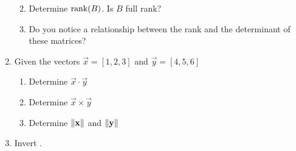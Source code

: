 \documentclass{16384_doc}
\begin{document}
\begin{questions}
\begin{parts}
\begin{enumerate}
\begin{enumerate}
\begin{tcolorbox}[height=3cm]
                        \end{tcolorbox}
						\item Determine $\operatorname{rank}(B)$. Is $B$ full rank?
						\begin{tcolorbox}[height=3cm]
					
                        \end{tcolorbox}
						\item Do you notice a relationship between the rank and the 
						determinant of these matrices?    
						\begin{tcolorbox}[height=5cm]
					
                        \end{tcolorbox}
					\end{enumerate}
					\item Given the vectors $\vec{x} = [1, 2, 3]$ and $\vec{y} = [4, 
					5, 6]$
					\begin{enumerate}
						\item Determine $\vec{x}\cdot\vec{y}$
						
						\begin{tcolorbox}[height=3cm]
					
                         
                        \end{tcolorbox}
						\item Determine $\vec{x}\times\vec{y}$
						
						\begin{tcolorbox}[height=3cm]
						
                     
                        \end{tcolorbox}
						\item Determine $\left\lVert\mathbf{x}\right\rVert$ and $\left\lVert\mathbf{y}\right\rVert$
						
						\begin{tcolorbox}[height=3cm]
                       
                        \end{tcolorbox}
					\end{enumerate}
					\item Invert .				\begin{tcolorbox}[height=5cm]
                    \end{tcolorbox}
                \end{enumerate}
        \end{parts}


\end{questions}
\end{document}
